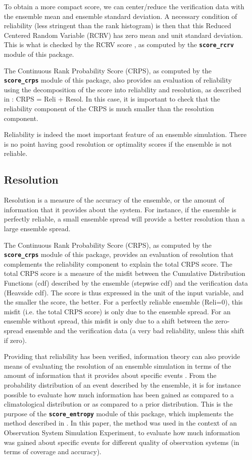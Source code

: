 \documentclass[11pt]{article}
\begin{document}
To obtain a more compact score, we can center/reduce
the verification data with the ensemble mean and ensemble standard deviation.
A necessary condition of reliability (less stringent than the rank histogram) is then that
this Reduced Centered Random Variable (RCRV) has zero mean and unit standard deviation.
This is what is checked by the RCRV score \citep{CAND07},
as computed by the {\tt\bf score\_rcrv} module of this package.

The Continuous Rank Probability Score (CRPS),
as computed by the {\tt\bf score\_crps} module of this package,
also provides an evaluation of reliability
using the decomposition of the score into reliability and resolution,
as described in \citet{HERS00}: CRPS = Reli + Resol.
In this case, it is important to check that the reliability component
of the CRPS is much smaller than the resolution component.

Reliability is indeed the most important feature of an ensemble simulation.
There is no point having good resolution or optimality scores
if the ensemble is not reliable.

\subsection{Resolution}

Resolution is a measure of the accuracy of the ensemble,
or the amount of information that it provides about the system.
For instance, if the ensemble is perfectly reliable,
a small ensemble spread will provide a better resolution
than a large ensemble spread.

The Continuous Rank Probability Score (CRPS),
as computed by the {\tt\bf score\_crps} module of this package,
provides an evaluation of resolution that complements
the reliability component to explain the total CRPS score.
The total CRPS score is a measure of the misfit between the Cumulative Distribution Functions (cdf)
described by the ensemble (stepwise cdf) and the verification data (Heavside cdf).
The score is thus expressed in the unit of the input variable,
and the smaller the score, the better.
For a perfectly reliable ensemble (Reli=0), this misfit (i.e. the total CRPS score)
is only due to the ensemble spread.
For an ensemble without spread, this misfit is only due to a shift
between the zero-spread ensemble and the verification data
(a very bad reliability, unless this shift if zero).

Providing that reliability has been verified,
information theory can also provide means of evaluating
the resolution of an ensemble simulation
in terms of the amount of information that it provides about specific events \citep{ROUL02}.
From the probability distribution of an event described by the ensemble,
it is for instance possible to evaluate how much information
has been gained as compared to a climatological distribution
or as compared to a prior distribution.
This is the purpose of the  {\tt\bf score\_entropy} module of this package,
which implements the method described in \citet{GERM19}.
In this paper, the method was used in the context
of an Observation System Simulation Experiment,
to evaluate how much information was gained about specific events
for different quality of observation systems
(in terms of coverage and accuracy).
\end{document}
